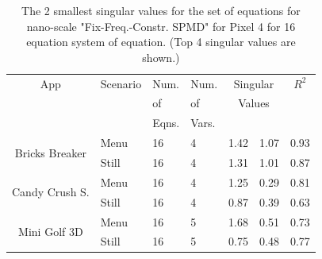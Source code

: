 \begin{table}[tb]
{\footnotesize
    \centering
    \caption{The 2 smallest singular values for the set of equations for nano-scale "Fix-Freq.-Constr. SPMD" for Pixel 4  for 16 equation system of equation.
    (Top 4 singular values are shown.)
    }
    \vspace{-0.1in}
    \begin{tabular}{|c|p{10.5mm}|p{7.5mm}|p{7.5mm}|c|c|c|}
    \hline
        App & Scenario & Num. & Num. &  \multicolumn{2}{c|}{Singular}  & $R^{2}$ \\
            &          &  of &   of &  \multicolumn{2}{c|}{Values}  &   \\
            &          & Eqns. & Vars. &  \multicolumn{2}{c|}{}  & \\
        \hline
        \multirow{2}{13mm}{Bricks Breaker} & Menu & 16 & 4  & 1.42  & 1.07 & 0.93 \\
         \cline{2-7}
         & Still & 16 & 4 & 1.31  & 1.01 & 0.87 \\
         \hline
        \multirow{2}{13mm}{Candy Crush S.} & Menu & 16 & 4  & 1.25 & 0.29 & 0.81 \\
        \cline{2-7}
	     & Still & 16 & 4 & 0.87  & 0.39 & 0.63 \\
	     \hline
         \multirow{2}{13mm}{Mini Golf 3D} & Menu & 16 & 5 & 1.68  & 0.51 & 0.73 \\
         \cline{2-7}
         & Still & 16 & 5 & 0.75 & 0.48 & 0.77 \\
         \hline
    \end{tabular}
    \label{tab:nano_rank_singular}
    \vspace{-0.1in}
}
\end{table}

